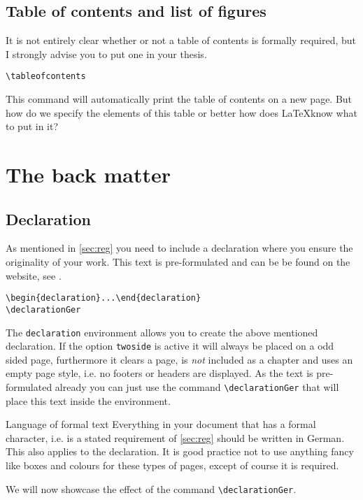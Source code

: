 \subsection{Table of contents and list of figures}
It is not entirely clear whether or not a table of contents is 
formally required, but I strongly advise you to put one in your thesis.
\begin{emphBox}
\lstinline|\tableofcontents|\\
\end{emphBox}
This command will automatically print the table of contents on a new page. But how do we 
specify the elements of this table or better how does \LaTeX know what to put in it?

\section{The back matter}\label{sec:back}
\subsection{Declaration}\label{par:decla} As mentioned in \cref{sec:reg} you need to include 
a declaration where you ensure the originality of your work. This text is pre-formulated 
and can be be found on the website, see \cite{FAUreg}.
\begin{emphBox}
\lstinline|\begin{declaration}...\end{declaration}|\\
\lstinline|\declarationGer|
\end{emphBox}
The \lstinline|declaration| environment allows you to create the above mentioned 
declaration. If the option \lstinline|twoside| is active it will always be placed on a odd 
sided page, furthermore it clears a page, is \emph{not} included as a chapter and uses an 
empty page style, i.e. no footers or headers are displayed. 
As the text is pre-formulated already you can just use the command \lstinline|\declarationGer| 
that will place this text inside the environment. 
\begin{memo}{Language of formal text}
Everything in your document that has a formal character, i.e. is a stated requirement of 
\cref{sec:reg} should be written in German. This also applies to the declaration. 
It is good practice not to use anything fancy like boxes and colours for these types of 
pages, except of course it is required. 
\end{memo}
We will now showcase the effect of the command \lstinline|\declarationGer|.
\declarationGer
